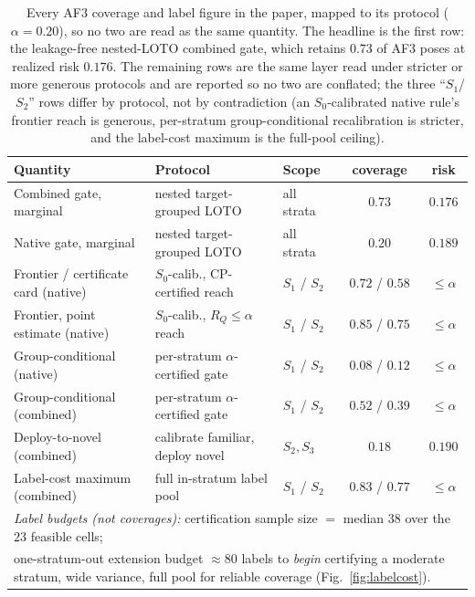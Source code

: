 \documentclass[10pt]{article}
\begin{document}
\begin{table}[t]
\centering\small
\caption{Every AF3 coverage and label figure in the paper, mapped to its protocol ($\alpha=0.20$), so no
two are read as the same quantity. The headline is the first row: the leakage-free nested-LOTO combined
gate, which retains $0.73$ of AF3 poses at realized risk $0.176$. The remaining rows are the same layer read
under stricter or more generous protocols and are reported so no two are conflated; the three ``$S_1$/$S_2$''
rows differ by protocol, not by contradiction (an $S_0$-calibrated native rule's frontier reach is generous,
per-stratum group-conditional recalibration is stricter, and the label-cost maximum is the full-pool
ceiling).}
\label{tab:covmap}
\begin{tabular}{lllcc}
\toprule
Quantity & Protocol & Scope & coverage & risk \\
\midrule
Combined gate, marginal & nested target-grouped LOTO & all strata & $0.73$ & $0.176$ \\
Native gate, marginal & nested target-grouped LOTO & all strata & $0.20$ & $0.189$ \\
Frontier / certificate card (native) & $S_0$-calib., CP-certified reach & $S_1$ / $S_2$ & $0.72$ / $0.58$ & $\le\alpha$ \\
Frontier, point estimate (native) & $S_0$-calib., $R_Q\le\alpha$ reach & $S_1$ / $S_2$ & $0.85$ / $0.75$ & $\le\alpha$ \\
Group-conditional (native) & per-stratum $\alpha$-certified gate & $S_1$ / $S_2$ & $0.08$ / $0.12$ & $\le\alpha$ \\
Group-conditional (combined) & per-stratum $\alpha$-certified gate & $S_1$ / $S_2$ & $0.52$ / $0.39$ & $\le\alpha$ \\
Deploy-to-novel (combined) & calibrate familiar, deploy novel & $S_2,S_3$ & $0.18$ & $0.190$ \\
Label-cost maximum (combined) & full in-stratum label pool & $S_1$ / $S_2$ & $0.83$ / $0.77$ & $\le\alpha$ \\
\midrule
\multicolumn{5}{l}{\emph{Label budgets (not coverages):} certification sample size $=$ median $38$ over the
$23$ feasible cells;} \\
\multicolumn{5}{l}{one-stratum-out extension budget $\approx 80$ labels to \emph{begin} certifying a moderate stratum, wide
variance, full pool for reliable coverage (Fig.~\ref{fig:labelcost}).} \\
\bottomrule
\end{tabular}
\end{table}
\end{document}
